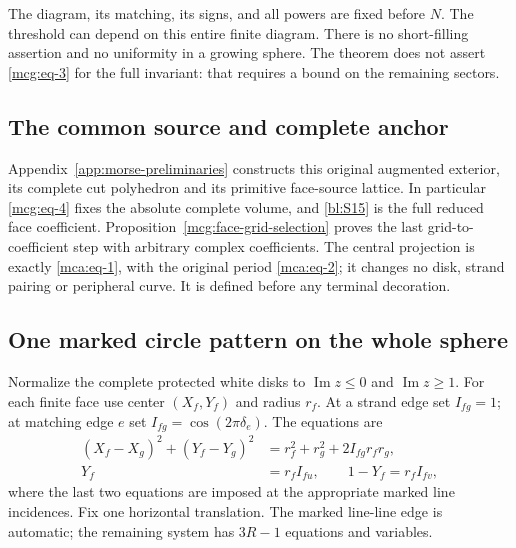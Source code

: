 The diagram, its matching, its signs, and all powers are fixed before
\(N\). The threshold can depend on this entire finite diagram. There is
no short-filling assertion and no uniformity in a growing sphere. The
theorem does not assert \eqref{mcg:eq-3} for the full invariant:
that requires a bound on the remaining sectors.

\subsection{The common source and complete anchor}
\label{mcg:sec-2}

Appendix~\ref{app:morse-preliminaries} constructs this original
augmented exterior, its complete cut polyhedron and its primitive
face-source lattice. In particular \eqref{mcg:eq-4} fixes the absolute
complete volume, and \eqref{bl:S15} is the full reduced face coefficient.
Proposition~\ref{mcg:face-grid-selection} proves the last grid-to-coefficient
step with arbitrary complex coefficients. The central projection is
exactly \eqref{mca:eq-1}, with the original period
\eqref{mca:eq-2}; it changes no disk, strand pairing or peripheral curve.
It is defined before any terminal decoration.

\subsection{One marked circle pattern on the whole
sphere}\label{mcg:sec-4}

Normalize the complete protected white disks to
\(\operatorname{Im}z\le0\) and \(\operatorname{Im}z\ge1\). For each
finite face use center \((X_f,Y_f)\) and radius \(r_f\). At a strand
edge set \(I_{fg}=1\); at matching edge \(e\) set
\(I_{fg}=\cos(2\pi\delta_e)\). The equations are \begin{equation}\label{mcg:eq-8}
\begin{aligned}
(X_f-X_g)^2+(Y_f-Y_g)^2
 &=r_f^2+r_g^2+2I_{fg}r_fr_g,\\
Y_f&=r_fI_{fu},\qquad
1-Y_f=r_fI_{fv},
\end{aligned}
\end{equation} where the last two equations are imposed at the appropriate marked
line incidences. Fix one horizontal translation. The marked line-line
edge is automatic; the remaining system has \(3R-1\) equations and
variables.

